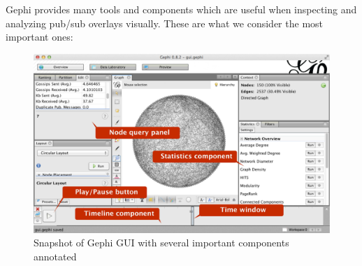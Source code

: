 Gephi provides many tools and components which are useful when
inspecting and analyzing pub/sub overlays visually. These are what we
consider the most important ones:

\begin{figure}[h]
    \centering
    \includegraphics[width=\textwidth]{figures/gui_ann}
    \caption{Snapshot of Gephi GUI with several important components
        annotated}
\end{figure}

